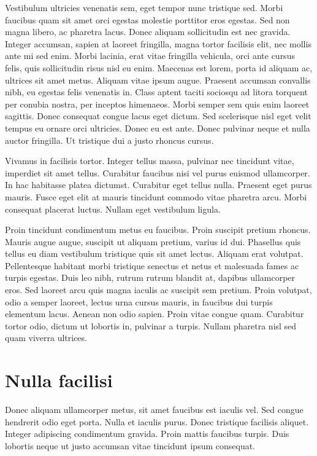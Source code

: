 Vestibulum ultricies venenatis sem, eget tempor nunc tristique sed. Morbi faucibus quam sit amet orci egestas molestie porttitor eros egestas. Sed non magna libero, ac pharetra lacus. Donec aliquam sollicitudin est nec gravida. Integer accumsan, sapien at laoreet fringilla, magna tortor facilisis elit, nec mollis ante mi sed enim. Morbi lacinia, erat vitae fringilla vehicula, orci ante cursus felis, quis sollicitudin risus nisl eu enim. Maecenas est lorem, porta id aliquam ac, ultrices sit amet metus. Aliquam vitae ipsum augue. Praesent accumsan convallis nibh, eu egestas felis venenatis in. Class aptent taciti sociosqu ad litora torquent per conubia nostra, per inceptos himenaeos. Morbi semper sem quis enim laoreet sagittis. Donec consequat congue lacus eget dictum. Sed scelerisque nisl eget velit tempus eu ornare orci ultricies. Donec eu est ante. Donec pulvinar neque et nulla auctor fringilla. Ut tristique dui a justo rhoncus cursus. 


Vivamus in facilisis tortor. Integer tellus massa, pulvinar nec tincidunt vitae, imperdiet sit amet tellus. Curabitur faucibus nisi vel purus euismod ullamcorper. In hac habitasse platea dictumst. Curabitur eget tellus nulla. Praesent eget purus mauris. Fusce eget elit at mauris tincidunt commodo vitae pharetra arcu. Morbi consequat placerat luctus. Nullam eget vestibulum ligula. 


Proin tincidunt condimentum metus eu faucibus. Proin suscipit pretium rhoncus. Mauris augue augue, suscipit ut aliquam pretium, varius id dui. Phasellus quis tellus eu diam vestibulum tristique quis sit amet lectus. Aliquam erat volutpat. Pellentesque habitant morbi tristique senectus et netus et malesuada fames ac turpis egestas. Duis leo nibh, rutrum rutrum blandit at, dapibus ullamcorper eros. Sed laoreet arcu quis magna iaculis ac suscipit sem pretium. Proin volutpat, odio a semper laoreet, lectus urna cursus mauris, in faucibus dui turpis elementum lacus. Aenean non odio sapien. Proin vitae congue quam. Curabitur tortor odio, dictum ut lobortis in, pulvinar a turpis. Nullam pharetra nisl sed quam viverra ultrices. 

\section{Nulla facilisi}
 Donec aliquam ullamcorper metus, sit amet faucibus est iaculis vel. Sed congue hendrerit odio eget porta. Nulla et iaculis purus. Donec tristique facilisis aliquet. Integer adipiscing condimentum gravida. Proin mattis faucibus turpis. Duis lobortis neque ut justo accumsan vitae tincidunt ipsum consequat. 


